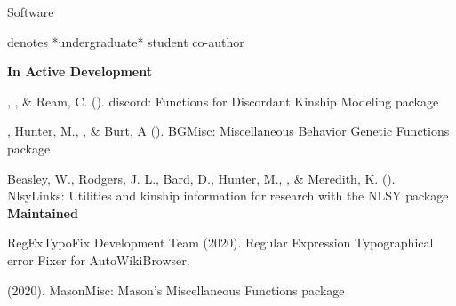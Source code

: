 \begin{rSection}{\textrm{Software}}%
\vspace{-1mm}\begin{center}\footnotesize{denotes *undergraduate* student co-author}\end{center}\vspace{-5mm}
{\large \textbf {In Active Development}}%
\begin{etaremune}
\item\meb, \jt, \& Ream, C. (\the\year). discord: Functions for Discordant Kinship Modeling \R package 
%
\item\meb, Hunter, M., \jt, \& Burt, A (\the\year). BGMisc: Miscellaneous Behavior Genetic Functions \R package %
%
%
\item  Beasley, W., Rodgers, J. L., Bard, D., Hunter, M., \meb, \& Meredith, K. (\the\year). NlsyLinks: Utilities and kinship information for research with the NLSY \R package \smallskip\\
%

\pagebreak
\hspace*{-8mm}\large{\bf{Maintained}}

\item RegExTypoFix Development Team (2020). Regular Expression Typographical error Fixer for AutoWikiBrowser. 
%
\item\meb (2020). MasonMisc: Mason's Miscellaneous Functions \R package 
%
%
\end{etaremune}
\end{rSection}